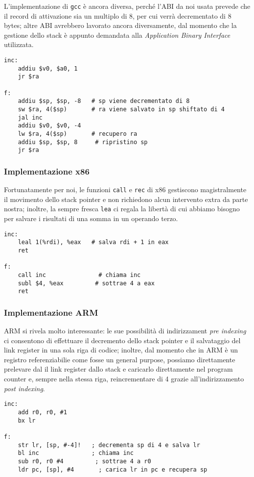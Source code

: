 \documentclass[class=book, crop=false, oneside]{standalone}
\begin{document}
L'implementazione di \texttt{gcc} è ancora diversa, perché l'ABI da noi usata prevede che il record di attivazione sia un multiplo di 8, per cui  verrà decrementato di 8 bytes; altre ABI avrebbero lavorato ancora diversamente, dal momento che la gestione dello stack è appunto demandata alla \emph{Application Binary Interface} utilizzata.
\begin{verbatim}
inc:
	addiu $v0, $a0, 1
	jr $ra

f:
	addiu $sp, $sp, -8	 # sp viene decrementato di 8
	sw $ra, 4($sp)	     # ra viene salvato in sp shiftato di 4
	jal inc
	addiu $v0, $v0, -4
	lw $ra, 4($sp)	     # recupero ra
	addiu $sp, $sp, 8	  # ripristino sp
	jr $ra
\end{verbatim}

\subsubsection{Implementazione x86}
Fortunatamente per noi, le funzioni \texttt{call} e \texttt{rec} di x86 gestiscono magistralmente il movimento dello stack pointer e non richiedono alcun intervento extra da parte nostra; inoltre, la sempre fresca \texttt{lea} ci regala la libertà di cui abbiamo bisogno per salvare i risultati di una somma in un operando terzo.
\begin{verbatim}
inc:
	leal 1(%rdi), %eax	 # salva rdi + 1 in eax
	ret

f:
	call inc	           # chiama inc
	subl $4, %eax	      # sottrae 4 a eax
	ret
\end{verbatim}

\subsubsection{Implementazione ARM}
ARM si rivela molto interessante: le sue possibilità di indirizzament \emph{pre indexing} ci consentono di effettuare il decremento dello stack pointer e il salvataggio del link register in una sola riga di codice; inoltre, dal momento che in ARM  è un registro referenziabilie come fosse un general purpose, possiamo direttamente prelevare dal il link register dallo stack e caricarlo direttamente nel program counter e, sempre nella stessa riga, reincrementare  di 4 grazie all'indirizzamento \emph{post indexing}.
\begin{verbatim}
inc:
	add r0, r0, #1
	bx lr

f:
	str lr, [sp, #-4]!	 ; decrementa sp di 4 e salva lr
	bl inc	             ; chiama inc
	sub r0, r0 #4	      ; sottrae 4 a r0
	ldr pc, [sp], #4	   ; carica lr in pc e recupera sp
\end{verbatim}
\end{document}
